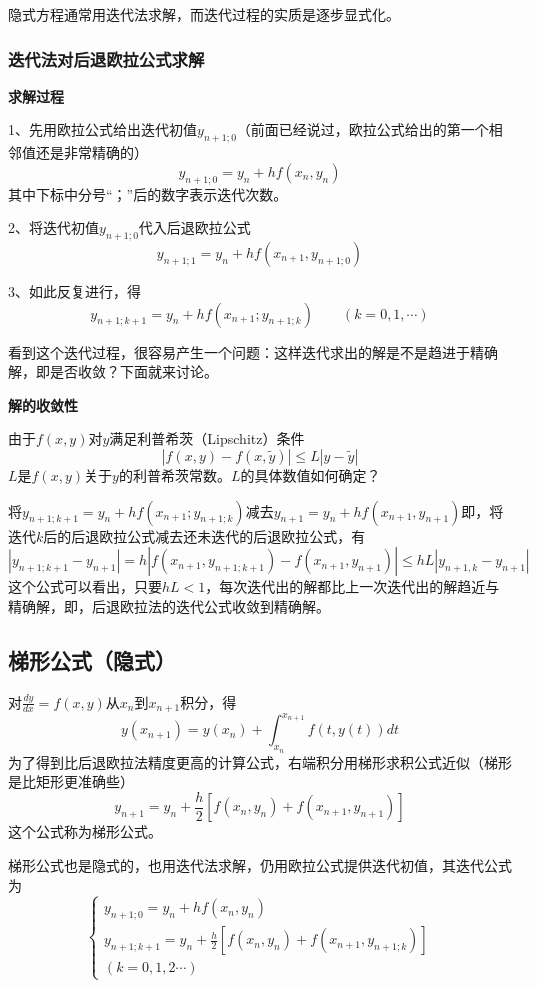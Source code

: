 隐式方程通常用迭代法求解，而迭代过程的实质是逐步显式化。

\subsubsection{迭代法对后退欧拉公式求解}
\textbf{求解过程}

1、先用欧拉公式给出迭代初值$y_{n+1;0}$（前面已经说过，欧拉公式给出的第一个相邻值还是非常精确的）
$$y_{n+1;0}=y_n+hf(x_n,y_n)$$
其中下标中分号“；”后的数字表示迭代次数。

2、将迭代初值$y_{n+1;0}$代入后退欧拉公式
$$y_{n+1;1}=y_n+hf(x_{n+1},y_{n+1;0})$$


3、如此反复进行，得
$$y_{n+1;k+1}=y_n+hf(x_{n+1};y_{n+1;k}) \qquad (k=0,1,\cdots)$$

看到这个迭代过程，很容易产生一个问题：这样迭代求出的解是不是趋进于精确解，即是否收敛？下面就来讨论。



\textbf{解的收敛性}

由于$f(x,y)$对$y$满足利普希茨（Lipschitz）条件
$$|f(x,y)-f(x,\tilde{y})|\le L|y-\tilde{y}|$$
$L$是$f(x,y)$关于$y$的利普希茨常数。$L$的具体数值如何确定？

将$y_{n+1;k+1}=y_n+hf(x_{n+1};y_{n+1;k})$减去$y_{n+1}=y_n+hf(x_{n+1},y_{n+1})$即，将迭代$k$后的后退欧拉公式减去还未迭代的后退欧拉公式，有
$$|y_{n+1;k+1}-y_{n+1}|=h|f(x_{n+1},y_{n+1;k+1})-f(x_{n+1},y_{n+1})|
\le hL|y_{n+1,k}-y_{n+1}|$$
这个公式可以看出，只要$hL<1$，每次迭代出的解都比上一次迭代出的解趋近与精确解，即，后退欧拉法的迭代公式收敛到精确解。



\subsection{梯形公式（隐式）}
对$\frac{dy}{dx}=f(x,y)$从$x_n$到$x_{n+1}$积分，得
$$y(x_{n+1})=y(x_n)+\int_{x_n}^{x_{n+1}}f(t,y(t))dt$$
为了得到比后退欧拉法精度更高的计算公式，右端积分用梯形求积公式近似（梯形是比矩形更准确些）
$$y_{n+1}=y_n+\frac{h}{2}[f(x_n,y_n)+f(x_{n+1},y_{n+1})]$$
这个公式称为梯形公式。

梯形公式也是隐式的，也用迭代法求解，仍用欧拉公式提供迭代初值，其迭代公式为
$$\begin{cases}y_{n+1;0}=y_n+hf(x_n,y_n)\\
y_{n+1;k+1}=y_n+\frac{h}{2}[f(x_n,y_n)+f(x_{n+1},y_{n+1;k})]\\
(k=0,1,2\cdots)\end{cases}$$

